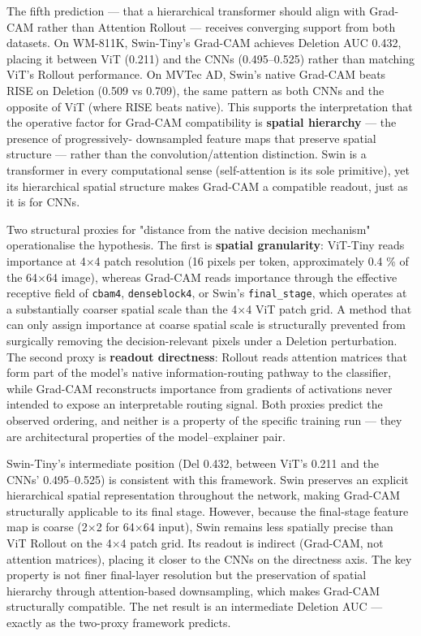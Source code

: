 \documentclass[11pt,a4paper]{article}
\begin{document}
The fifth prediction --- that a hierarchical transformer should align with Grad-CAM rather than Attention Rollout --- receives converging support from both datasets. On WM-811K, Swin-Tiny's Grad-CAM achieves Deletion AUC 0.432, placing it between ViT (0.211) and the CNNs (0.495--0.525) rather than matching ViT's Rollout performance. On MVTec AD, Swin's native Grad-CAM beats RISE on Deletion (0.509 vs 0.709), the same pattern as both CNNs and the opposite of ViT (where RISE beats native). This supports the interpretation that the operative factor for Grad-CAM compatibility is \textbf{spatial hierarchy} --- the presence of progressively- downsampled feature maps that preserve spatial structure --- rather than the convolution/attention distinction. Swin is a transformer in every computational sense (self-attention is its sole primitive), yet its hierarchical spatial structure makes Grad-CAM
a compatible readout, just as it is for CNNs.

Two structural proxies for "distance from the native decision mechanism" operationalise the hypothesis. The first is \textbf{spatial granularity}: ViT-Tiny reads importance at 4$\times$4 patch resolution (16 pixels per token, approximately 0.4 \% of the 64$\times$64 image), whereas Grad-CAM reads importance through the effective receptive field of \texttt{cbam4}, \texttt{denseblock4}, or Swin's \texttt{final\_stage}, which operates at a substantially coarser spatial scale than the 4$\times$4 ViT patch grid. A method that can only assign importance at coarse spatial scale is structurally prevented from surgically removing the decision-relevant pixels under a Deletion perturbation. The second proxy is \textbf{readout directness}: Rollout reads attention matrices that form part of the model's native information-routing pathway to the classifier, while Grad-CAM reconstructs importance from
gradients of activations never intended to expose an interpretable routing signal. Both proxies predict the observed ordering, and neither is a property of the specific training run --- they are architectural properties of the model--explainer pair.

Swin-Tiny's intermediate position (Del 0.432, between ViT's 0.211 and the CNNs' 0.495--0.525) is consistent with this framework. Swin preserves an explicit hierarchical spatial representation throughout the network, making Grad-CAM structurally applicable to its final stage. However, because the final-stage feature map is coarse (2$\times$2 for 64$\times$64 input), Swin remains less spatially precise than ViT Rollout on the 4$\times$4 patch grid. Its readout is indirect (Grad-CAM, not attention matrices), placing it closer to the CNNs on the directness axis. The key property is not finer final-layer resolution but the preservation of spatial hierarchy through attention-based downsampling, which makes Grad-CAM structurally compatible. The net result is an intermediate Deletion AUC --- exactly as the two-proxy framework predicts.
\end{document}
